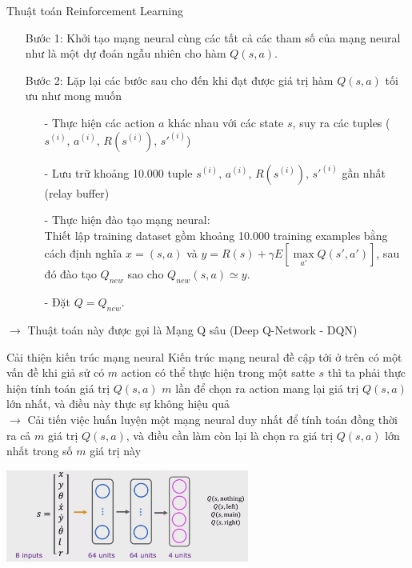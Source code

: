 \documentclass[10pt,aspectratio=169]{beamer}
\begin{document}
\begin{frame}{Thuật toán Reinforcement Learning}
\begin{itemize}
\setlength\itemsep{8pt}
\item[Bước 1:] Khởi tạo mạng neural cùng các tất cả các tham số của mạng neural như là một dự đoán ngẫu nhiên cho hàm $ Q(s,a) $.
\item[Bước 2:] Lặp lại các bước sau cho đến khi đạt được giá trị hàm $ Q(s,a) $ tối ưu như mong muốn\\
\vspace{4pt}
\begin{itemize}
\setlength\itemsep{4pt}
\item[-] Thực hiện các action $ a $ khác nhau với các state $ s $, suy ra các tuples ($ s^{(i)},\,a^{(i)},\,R(s^{(i)}),\,s'^{(i)} $) 
\item[-] Lưu trữ khoảng 10.000 tuple $ s^{(i)},\,a^{(i)},\,R(s^{(i)}),\,s'^{(i)} $ gần nhất (relay buffer)
\item[-] Thực hiện đào tạo mạng neural:\\
\vspace{4pt}
Thiết lập training dataset gồm khoảng 10.000 training examples bằng cách định nghĩa $ x = (s,a) $ và $ y = R(s) + \gamma E[\max\limits_{a'} Q(s',a')] $, sau đó đào tạo $ Q_{new} $ sao cho $ Q_{new}(s,a) \simeq y $.
\item[-] Đặt $ Q = Q_{new} $.
\end{itemize}
\end{itemize}
$ \longrightarrow $ Thuật toán này được gọi là \textcolor{mainblue}{Mạng Q sâu (Deep Q-Network - DQN)}\footnotemark
{}
\end{frame}

\begin{frame}{Cải thiện kiến trúc mạng neural}{\subsecname}
Kiến trúc mạng neural đề cập tới ở trên có một vấn đề khi giả sử có $ m $ action có thể thực hiện trong một satte $ s $ thì ta phải thực hiện tính toán giá trị $ Q(s,a) $ $ m $ lần để chọn ra action mang lại giá trị $ Q(s,a) $ lớn nhất, và điều này thực sự không hiệu quả\\
\vspace{8pt}
$ \longrightarrow $ Cải tiến việc huấn luyện một mạng neural duy nhất để tính toán đồng thời ra cả $ m $ giá trị $ Q(s,a) $, và điều cần làm còn lại là chọn ra giá trị $ Q(s,a) $ lớn nhất trong số $ m $ giá trị này\\
\begin{center}
\includegraphics[width=0.6\textwidth]{source/12.png}
\end{center}
\end{frame}
\end{document}

